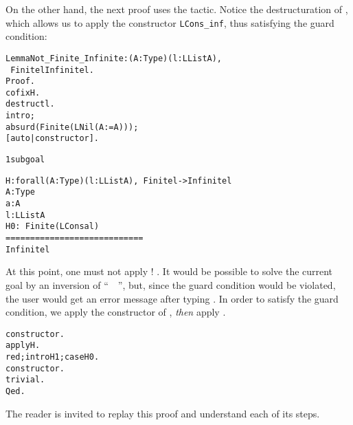 \documentclass[11pt]{article}
\begin{document}
On the other hand, the next proof uses the  tactic.
Notice the destructuration of , which allows us to
apply  the constructor \texttt{LCons\_inf}, thus  satisfying
 the guard condition:
\begin{alltt}
Lemma Not_Finite_Infinite : {\prodsym} (A:Type)(l:LList A),
                            ~ Finite l {\arrow} Infinite l.
Proof.
 cofix H.
 destruct l.
 intro;
  absurd (Finite (LNil (A:=A)));
  [auto|constructor].
\it




1 subgoal

  H : forall (A : Type) (l : LList A), ~ Finite l -> Infinite l
  A : Type
  a : A
  l : LList A
  H0 : ~ Finite (LCons a l)
  ============================
   Infinite l
\end{alltt}
At this point, one must not apply ! . It would be possible
to solve the current goal by an inversion of ``~~'', but, since the guard condition would be violated, the user
would get an error message after typing .
In order to satisfy the guard condition, we apply the constructor of
, \emph{then} apply .

\begin{alltt}
 constructor.
 apply H.
 red; intro H1;case H0.
 constructor.
 trivial.
Qed.
\end{alltt}




The reader is invited to replay this proof and understand each of its steps.




\end{document}
